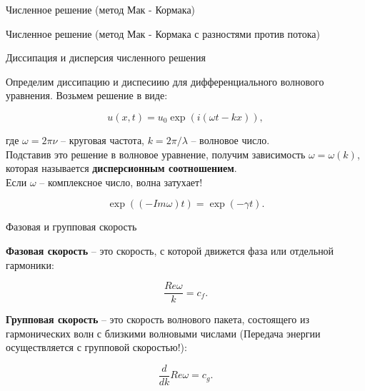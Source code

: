 \documentclass[10pt,xcolor=pst,aspectratio=169]{beamer}
\begin{document}
\begin{frame}{Численное решение (метод Мак - Кормака)}

	\transdissolve[duration=0.1]
	\justifying
	\large

    \begin{figure}[h]
    \end{figure}

\end{frame}

\begin{frame}{Численное решение (метод Мак - Кормака с разностями против потока)}

	\transdissolve[duration=0.1]
	\justifying
	\large

    \begin{figure}[h]
    \end{figure}

\end{frame}

\begin{frame}{Диссипация и дисперсия численного решения}

	\transdissolve[duration=0.1]
	\justifying
	\large

	Определим диссипацию и диспесиию для дифференциального волнового уравнения. Возьмем решение в виде:

	\[
		u(x, t) = u_{0} \exp{(i (\omega t - k x))},
	\]

	где $\omega = 2 \pi \nu$ -- круговая частота, $k = 2 \pi / \lambda$ -- волновое число.\\

	Подставив это решение в волновое уравнение, получим зависимость $\omega = \omega(k)$, которая называется \textbf{дисперсионным соотношением}.\\

	Если $\omega$ -- комплексное число, волна затухает!

	\[
		\exp{((- Im \omega) t)} = \exp{(- \gamma t)}.
	\]

\end{frame}

\begin{frame}{Фазовая и групповая скорость}

	\transdissolve[duration=0.1]
	\justifying
	\large

	\textbf{Фазовая скорость} -- это скорость, с которой движется фаза или отдельной гармоники:

	\[
		\frac{Re \omega}{k} = c_{f}.
	\]

	\textbf{Групповая скорость} -- это скорость волнового пакета, состоящего из гармонических волн с близкими волновыми числами (Передача энергии осуществляется с групповой скоростью!):

	\[
		\frac{d}{d k} Re \omega = c_{g}.
	\]

\end{frame}
\end{document}
